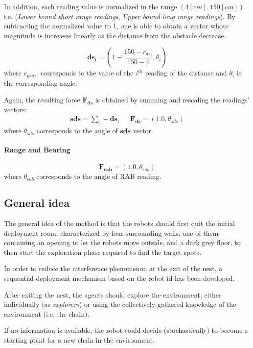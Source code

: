 In addition, each reading value is normalized in the range $(4[cm],150[cm])$ 
i.e. (\emph{Lower bound short range readings}, \emph{Upper bound long range readings}).
By subtracting the normalized value to 1, one is able to obtain a vector whose 
magnitude is increases linearly as the distance from the obstacle decrease.

\begin{equation}
\mathbf{ds_i} = (1 - \frac{150 - r_{ds_{i}}}{150-4},\theta_i)  
\end{equation}
where $r_{prox_i}$ corresponds to the value of the $i^{th}$ reading of the distance and $\theta_i$ is the corresponding angle.

Again, the resulting force $\mathbf{F_{ds}}$ is obtained by summing and rescaling the readings' vectors: 
\begin{align}
\mathbf{sds} = \sum_i -\mathbf{ds_i} & & \mathbf{F_{ds}} = (1.0,\theta_{sds})   
\end{align}
where $\theta_{sds}$ corresponds to the angle of $\mathbf{sds}$ vector.

\paragraph{Range and Bearing}
\begin{equation}
\mathbf{F_{rab}} = (1.0,\theta_{rab})  
\end{equation}
where $\theta_{rab}$ corresponds to the angle of RAB reading.

\subsection{General idea}
The general idea of the method is that the robots should first quit the initial deployment room, characterized by four surrounding walls, one of them containing an opening to let the robots move outside, and a dark grey floor, to then start the exploration phase required to find the target spots.

In order to reduce the interference phenomenon at the exit of the nest, a sequential deployment mechanism based on the robot id has been developed.

After exiting the nest, the agents should explore the environment, either individually (as \emph{explorers}) or using the collectively-gathered knowledge of the environment (i.e. the chain).

If no information is available, the robot could decide (stochastically) to become a starting point for a new chain in the environment.

